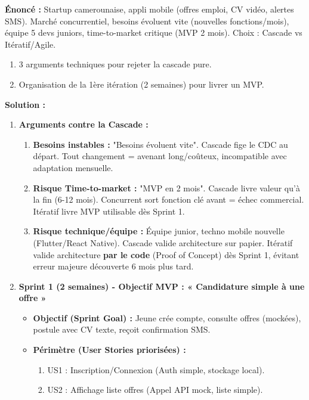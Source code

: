 \documentclass[11pt]{article}
\begin{document}
\begin{exoresolu}
\textbf{Énoncé :} Startup camerounaise, appli mobile (offres emploi, CV vidéo, alertes SMS). Marché concurrentiel, besoins évoluent vite (nouvelles fonctions/mois), équipe 5 devs juniors, time-to-market critique (MVP 2 mois). Choix : Cascade vs Itératif/Agile.
\begin{enumerate}
    \item 3 arguments techniques pour rejeter la cascade pure.
    \item Organisation de la 1ère itération (2 semaines) pour livrer un MVP.
\end{enumerate}
\tcblower
\textbf{Solution :}
\begin{enumerate}
    \item \textbf{Arguments contre la Cascade :}
        \begin{enumerate}
            \item \textbf{Besoins instables :} "Besoins évoluent vite". Cascade fige le CDC au départ. Tout changement = avenant long/coûteux, incompatible avec adaptation mensuelle.
            \item \textbf{Risque Time-to-market :} "MVP en 2 mois". Cascade livre valeur qu'à la fin (6-12 mois). Concurrent sort fonction clé avant = échec commercial. Itératif livre MVP utilisable dès Sprint 1.
            \item \textbf{Risque technique/équipe :} Équipe junior, techno mobile nouvelle (Flutter/React Native). Cascade valide architecture sur papier. Itératif valide architecture \textbf{par le code} (Proof of Concept) dès Sprint 1, évitant erreur majeure découverte 6 mois plus tard.
        \end{enumerate}
    \item \textbf{Sprint 1 (2 semaines) - Objectif MVP : « Candidature simple à une offre »}
        \begin{itemize}
            \item \textbf{Objectif (Sprint Goal) :} Jeune crée compte, consulte offres (mockées), postule avec CV texte, reçoit confirmation SMS.
            \item \textbf{Périmètre (User Stories priorisées) :}
                \begin{enumerate}
                    \item US1 : Inscription/Connexion (Auth simple, stockage local).
                    \item US2 : Affichage liste offres (Appel API mock, liste simple).

\end{enumerate}
\end{itemize}
\end{enumerate}
\end{exoresolu}
\end{document}
